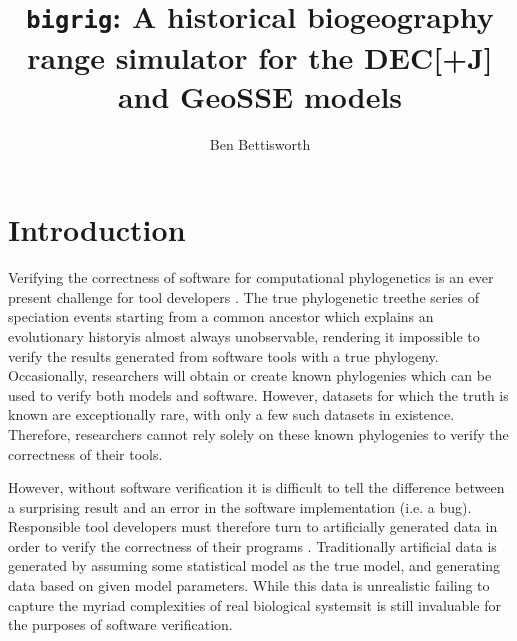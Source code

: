 \documentclass{article}
\title{\texttt{bigrig}: A historical biogeography range simulator for the
	DEC[+J] and GeoSSE models}
\author{Ben Bettisworth}
\begin{document}
\newcommand{\CountFull}[1]{|#1|_\text{full}}
\newcommand{\CountEmpty}[1]{|#1|_\text{empty}}
\newcommand{\bigrig}{\texttt{bigrig}}
\newcommand{\rand}[2]{#1 \land #2}
\newcommand{\ror}[2]{#1 \lor #2}
\newcommand{\rneg}[1]{\neg #1}
\newcommand{\rxor}[2]{#1 \oplus #2}
\newcommand{\rLshift}[2]{#1 \ll #2}
\newcommand{\rRshift}[2]{#1 \gg #2}

\maketitle

\section{Introduction}

Verifying the correctness of software for computational phylogenetics is an ever
present challenge for tool developers \cite{carver_software_2007,
bettisworth_lagrange-ng_2023}. 
The true phylogenetic tree\textemdash the series of speciation events starting
from a common ancestor which explains an evolutionary history\textemdash is
almost always unobservable, rendering it impossible to verify the results
generated from software tools with a true phylogeny.
Occasionally, researchers will obtain or create known phylogenies
\cite{hillis_experimental_1992} which can be used to verify both models and
software. 
However, datasets for which the truth is known are exceptionally rare, with only
a few such datasets in existence.
Therefore, researchers cannot rely solely on these known phylogenies to
verify the correctness of their tools.

However, without software verification it is difficult to tell the difference
between a surprising result and an error in the software implementation (i.e. a
bug).
Responsible tool developers must therefore turn to artificially generated data
in order to verify the correctness of their programs \cite{ly-trong_alisim_2022,
fletcher_indelible_2009}.
Traditionally artificial data is generated by assuming some statistical model
as the true model, and generating data based on given model parameters.
While this data is unrealistic \cite{trost_simulations_2024}\textemdash failing to
capture the myriad complexities of real biological systems\textemdash it is
still invaluable for the purposes of software verification.
\end{document}
